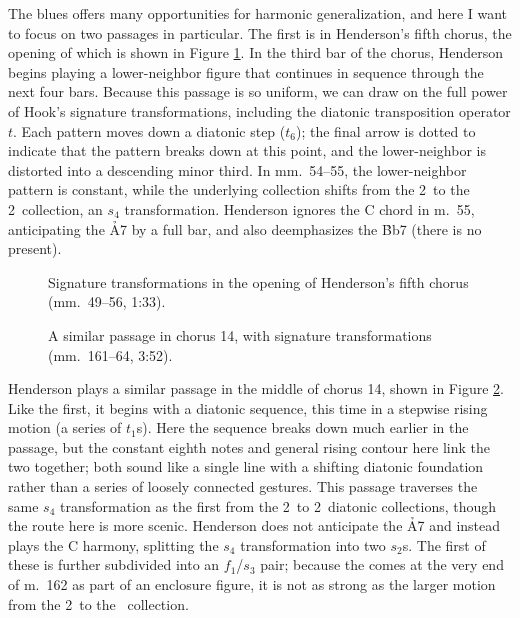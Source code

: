 The blues offers many opportunities for harmonic generalization, and here I
want to focus on two passages in particular. The first is in
Henderson's fifth chorus, the opening of which is shown in Figure
\ref{csa:henderson-chorus-five}. In the third bar of the chorus, Henderson
begins playing a lower-neighbor figure that continues in sequence through the
next four bars. Because this passage is so uniform, we can draw on the full
power of Hook's signature transformations, including the diatonic
transposition operator $t$. Each pattern moves down a diatonic step
($t_6$); the final arrow is dotted to indicate that the pattern breaks down at
this point, and the lower-neighbor is distorted into a descending minor third.
In mm.~54--55, the lower-neighbor pattern is constant, while the underlying
collection shifts from the 2\flat\ to the 2\sharp\ collection, an $s_4$
transformation. Henderson ignores the C chord in m.~55,
anticipating the \h{A7} by a full bar, and also deemphasizes the \h{Bb7}
(there is no \Aflat present).

\begin{figure}[tbp]
  \caption[Signature transformations in the opening of Henderson's fifth
    chorus.]{Signature transformations in the opening of Henderson's fifth
    chorus (mm.~49--56, 1:33).}
  \label{csa:henderson-chorus-five}
\end{figure}

\begin{figure}[tbp]
  \caption[A similar passage in chorus 14, with signature transformations.]{A
    similar passage in chorus 14, with signature transformations
    (mm.~161--64, 3:52).}
  \label{csa:henderson-chorus-fourteen}
\end{figure}

Henderson plays a similar passage in the middle of chorus 14, shown in Figure
\ref{csa:henderson-chorus-fourteen}. Like the first, it begins with a diatonic
sequence, this time in a stepwise rising motion (a series of $t_1$s). Here the
sequence breaks down much earlier in the passage, but the constant eighth
notes and general rising contour here link the two together; both sound like a
single line with a shifting diatonic foundation rather than a series of
loosely connected gestures. This passage traverses the same $s_4$
transformation as the first from the 2\flat\ to 2\sharp\ diatonic collections,
though the route here is more scenic. Henderson does not anticipate the \h{A7}
and instead plays the C harmony, splitting the $s_4$ transformation into two
$s_2$s. The first of these is further subdivided into an $f_1$/$s_3$ pair;
because the \Aflat comes at the very end of m.~162 as part of an enclosure
figure, it is not as strong as the larger motion from the 2\flat\ to the \nat\
collection.

